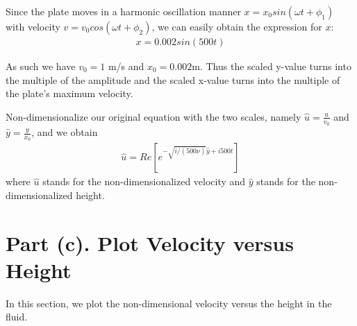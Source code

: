 \documentclass{article}
\begin{document}
Since the plate moves in a harmonic oscillation manner $x = x_0 sin(\omega t+\phi_1)$ with velocity $v = v_0 cos(\omega t+\phi_2)$, we can easily obtain the expression for $x$:
\begin{align}
x = 0.002sin(500t)
\end{align}

As such we have $v_0 = 1$ m/s and $x_0 = 0.002 $m. Thus the scaled y-value turns into the multiple of the amplitude and the scaled x-value turns into the multiple of the plate's maximum velocity.

Non-dimensionalize our original equation with the two scales, namely $\hat{u} = \frac{u}{v_0}$ and $\hat{y} = \frac{y}{x_0}$,
and we obtain
\begin{align}
\hat{u} = Re[e^{-\sqrt{i/(500\nu)}\hat{y} + i500t}]
\end{align}
where $\hat{u}$ stands for the non-dimensionalized velocity and $\hat{y}$ stands for the non-dimensionalized height.
%

\section{Part (c). Plot Velocity versus Height}
In this section, we plot the non-dimensional velocity versus the height in the fluid.
\end{document}
